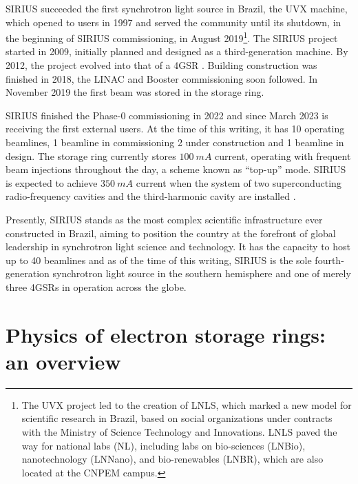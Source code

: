SIRIUS succeeded the first synchrotron light source in Brazil, the UVX machine, which opened to users in 1997 and served the community until its shutdown, in the beginning of SIRIUS commissioning, in August 2019\footnote{The UVX project led to the creation of LNLS, which marked a new model for scientific research in Brazil, based on social organizations under contracts with the Ministry of Science Technology and Innovations. LNLS paved the way for national labs (NL), including labs on bio-sciences (LNBio), nanotechnology (LNNano), and bio-renewables (LNBR), which are also located at the CNPEM campus.}\cite{liu_synchrotron_2019}. The SIRIUS project started in 2009, initially planned and designed as a third-generation machine. By 2012, the project evolved into that of a 4GSR \cite{liu_synchrotron_2019}. Building construction was finished in 2018, the LINAC and Booster commissioning soon followed. In November 2019 the first beam was stored in the storage ring.

SIRIUS finished the Phase-0 commissioning in 2022 and since March 2023 is receiving the first external users. At the time of this writing,  it has 10 operating beamlines, 1 beamline in commissioning 2 under construction and 1 beamline in design\cite{lnls_beamlines}. The storage ring currently stores $100~\unit{mA}$ current, operating with frequent beam injections throughout the day, a scheme known as ``top-up'' mode. SIRIUS is expected to achieve $350~\unit{mA}$ current when the system of two superconducting radio-frequency cavities and the third-harmonic cavity are installed \cite{liu_status_2022,liu_status_2023}.

Presently, SIRIUS stands as the most complex scientific infrastructure ever constructed in Brazil, aiming to position the country at the forefront of global leadership in synchrotron light science and technology. It has the capacity to host up to 40 beamlines and as of the time of this writing, SIRIUS is the sole fourth-generation synchrotron light source in the southern hemisphere and one of merely three 4GSRs in operation across the globe.

\section*{Physics of electron storage rings: an overview}

